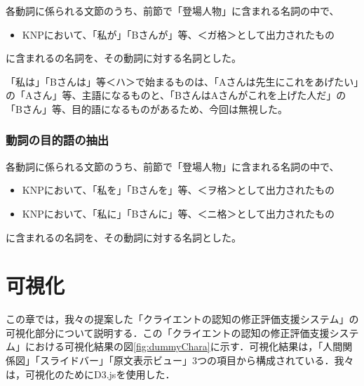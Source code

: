 \documentclass[shuuron]{kuee}
\begin{document}
各動詞に係られる文節のうち、前節で「登場人物」に含まれる名詞の中で、

\begin{itemize}

  \item KNPにおいて、「私が」「Bさんが」等、＜ガ格＞として出力されたもの
\end{itemize}
に含まれるの名詞を、その動詞に対する名詞とした。

「私は」「Bさんは」等＜ハ＞で始まるものは、「Aさんは先生にこれをあげたい」の「Aさん」等、主語になるものと、「BさんはAさんがこれを上げた人だ」の「Bさん」等、目的語になるものがあるため、今回は無視した。

\subsubsection{動詞の目的語の抽出}


各動詞に係られる文節のうち、前節で「登場人物」に含まれる名詞の中で、

\begin{itemize}

  \item KNPにおいて、「私を」「Bさんを」等、＜ヲ格＞として出力されたもの
  \item KNPにおいて、「私に」「Bさんに」等、＜ニ格＞として出力されたもの
\end{itemize}
に含まれるの名詞を、その動詞に対する名詞とした。


\section{可視化}

この章では，我々の提案した「クライエントの認知の修正評価支援システム」の可視化部分について説明する．この「クライエントの認知の修正評価支援システム」における可視化結果の図\ref{fig:dummyChara}に示す．可視化結果は，「人間関係図」「スライドバー」「原文表示ビュー」3つの項目から構成されている．我々は，可視化のためにD3.js\cite{vand3}を使用した．%
\end{document}
